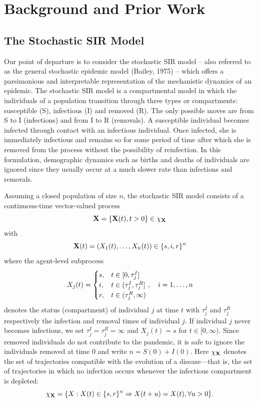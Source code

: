 \documentclass[11pt]{article}
\begin{document}
	\section{Background and Prior Work}
	\label{sec:set}
	
	\subsection{The Stochastic SIR Model}
	\label{sec:sir}
	
	Our point of departure is to consider the stochastic SIR model -- also referred to as the general stochastic epidemic model (Bailey, 1975) -- which offers a parsimonious and interpretable representation of the mechanistic dynamics of an epidemic. The stochastic SIR model is a compartmental model in which the individuals of a population transition through three types or compartments: susceptible (S), infectious (I) and removed (R). The only possible moves are from S to I (infections) and from I to R (removals). A susceptible individual becomes infected through contact with an infectious individual. Once infected, she is immediately infectious and remains so for some period of time after which she is removed from the process without the possibility of reinfection. In this formulation, demographic dynamics such as births and deaths of individuals are ignored since they usually occur at a much slower rate than infections and removals.
	
	Assuming a closed population of size $n$, the stochastic SIR model consists of a continuous-time vector-valued process
	\begin{equation}
		\label{eq:X}
		\mathbf{X} = \left\lbrace \mathbf{X}(t), t>0\right\rbrace \in \chi_{\mathbf{X}}
	\end{equation}
	with
	\begin{equation}
		\mathbf{X}(t) = (X_1(t), \dots, X_n(t)) \in \{s, i, r\}^n
	\end{equation}
	where the agent-level subprocess
	$$ X_j(t) = 
	\begin{cases}
		s, & t \in [0, \tau^I_j] \\
		i, & t \in (\tau^I_j, \tau^R_j] \\
		r, & t \in (\tau^R_j, \infty)
	\end{cases}
	,\quad i=1,\dots,n
	$$
	denotes the status (compartment) of individual $j$ at time $t$ with $\tau^I_j$ and $\tau^R_j$ respectively the infection and removal times of individual $j$. If individual $j$ never becomes infectious, we set $\tau^I_j = \tau^R_j = \infty$ and $X_j(t) = s$ for $t \in [0, \infty)$. Since removed individuals do not contribute to the pandemic, it is safe to ignore the individuals removed at time $0$ and write $n = S(0) + I(0)$. Here $\chi_{\mathbf{X}}$ denotes the set of trajectories compatible with the evolution of a disease---that is, the set of trajectories in which no infection occurs whenever the infectious compartment is depleted:
	\begin{equation}
		\label{eq:chi}
		\chi_{\mathbf{X}} = \{X:X(t) \in \{s,r\}^n \Rightarrow X(t+u) = X(t), \forall u>0 \}.
	\end{equation}
	
\end{document}

